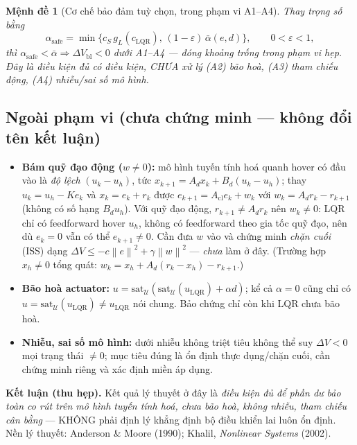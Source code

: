 \documentclass[11pt]{article}
\newtheorem{proposition}{Mệnh đề}
\newcommand{\norm}[1]{\left\lVert #1 \right\rVert}
\newcommand{\cS}{c_{S}}
\newcommand{\cL}{c_{\mathrm{LQR}}}
\newcommand{\uL}{u_{\mathrm{LQR}}}
\newcommand{\Acl}{A_{\mathrm{cl}}}
\begin{document}
\begin{proposition}[Cơ chế bảo đảm tuỳ chọn, trong phạm vi A1--A4]\label{prop2}
Thay trọng số bằng
\[
\alpha_{\mathrm{safe}}=\min\!\big\{\cS\,g_L(\cL),\,(1-\varepsilon)\,\bar\alpha(e,d)\big\},\qquad 0<\varepsilon<1,
\]
thì $\alpha_{\mathrm{safe}}<\bar\alpha\Rightarrow\Delta V_{\mathrm{bl}}<0$ dưới A1--A4 ---
đóng khoảng trống \emph{trong phạm vi hẹp}. Đây là điều kiện đủ có điều kiện, CHƯA xử lý (A2) bão hoà,
(A3) tham chiếu động, (A4) nhiễu/sai số mô hình.
\end{proposition}

\subsection{Ngoài phạm vi (chưa chứng minh --- không đổi tên kết luận)}
\begin{itemize}[leftmargin=1.4em,itemsep=1pt]
\item \textbf{Bám quỹ đạo động ($w\ne0$):} mô hình tuyến tính hoá quanh hover có đầu vào là \emph{độ lệch}
$(u_k-u_h)$, tức $x_{k+1}=A_d x_k+B_d(u_k-u_h)$; thay $u_k=u_h-Ke_k$ và $x_k=e_k+r_k$ được
$e_{k+1}=\Acl e_k+w_k$ với $\boxed{w_k=A_d r_k-r_{k+1}}$ (không có số hạng $B_d u_h$). Với quỹ đạo động,
$r_{k+1}\ne A_d r_k$ nên $w_k\ne0$: LQR chỉ có feedforward hover $u_h$, không có feedforward theo gia tốc
quỹ đạo, nên dù $e_k=0$ vẫn có thể $e_{k+1}\ne0$. Cần đưa $w$ vào và chứng minh \emph{chặn cuối} (ISS)
dạng $\Delta V\le-c\norm{e}^2+\gamma\norm{w}^2$ --- \emph{chưa} làm ở đây. (Trường hợp $x_h\ne0$ tổng
quát: $w_k=x_h+A_d(r_k-x_h)-r_{k+1}$.)
\item \textbf{Bão hoà actuator:} $u=\mathrm{sat}_{\mathcal U}(\mathrm{sat}_{\mathcal U}(\uL)+\alpha d)$;
kể cả $\alpha=0$ cũng chỉ có $u=\mathrm{sat}_{\mathcal U}(\uL)\ne\uL$ nói chung. Bảo chứng chỉ còn khi LQR
chưa bão hoà.
\item \textbf{Nhiễu, sai số mô hình:} dưới nhiễu không triệt tiêu không thể suy $\Delta V<0$ mọi trạng thái
$\ne0$; mục tiêu đúng là ổn định thực dụng/chặn cuối, cần chứng minh riêng và xác định miền áp dụng.
\end{itemize}
\noindent\textbf{Kết luận (thu hẹp).} Kết quả lý thuyết ở đây là \emph{điều kiện đủ để phần dư bảo toàn co
rút trên mô hình tuyến tính hoá, chưa bão hoà, không nhiễu, tham chiếu cân bằng} --- KHÔNG phải định lý
khẳng định bộ điều khiển lai luôn ổn định. Nền lý thuyết: Anderson \& Moore (1990); Khalil, \emph{Nonlinear
Systems} (2002).

\end{document}

